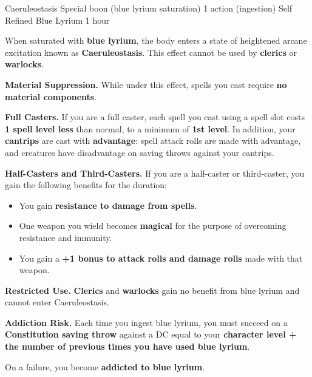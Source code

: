 \documentclass{apotheosis-book}
\begin{document}
\DndSpellHeader%
  {Caeruleostasis}
  {Special boon (blue lyrium saturation)}
  {1 action (ingestion)}
  {Self}
  {Refined Blue Lyrium}
  {1 hour}

When saturated with \textbf{blue lyrium}, the body enters a state of heightened arcane excitation known as \textbf{Caeruleostasis}. This effect cannot be used by \textbf{clerics} or \textbf{warlocks}.

\textbf{Material Suppression.}  
While under this effect, spells you cast require \textbf{no material components}.

\textbf{Full Casters.}  
If you are a full caster, each spell you cast using a spell slot costs \textbf{1 spell level less} than normal, to a minimum of \textbf{1st level}. In addition, your \textbf{cantrips} are cast with \textbf{advantage}: spell attack rolls are made with advantage, and creatures have disadvantage on saving throws against your cantrips.

\textbf{Half-Casters and Third-Casters.}  
If you are a half-caster or third-caster, you gain the following benefits for the duration:

\begin{itemize}
\item You gain \textbf{resistance to damage from spells}.
\item One weapon you wield becomes \textbf{magical} for the purpose of overcoming resistance and immunity.
\item You gain a \textbf{+1 bonus to attack rolls and damage rolls} made with that weapon.
\end{itemize}

\textbf{Restricted Use.}  
\textbf{Clerics} and \textbf{warlocks} gain no benefit from blue lyrium and cannot enter Caeruleostasis.

\textbf{Addiction Risk.}  
Each time you ingest blue lyrium, you must succeed on a \textbf{Constitution saving throw} against a DC equal to your \textbf{character level + the number of previous times you have used blue lyrium}.

On a failure, you become \textbf{addicted to blue lyrium}.

\subsection{}

\subsection{}
\end{document}
